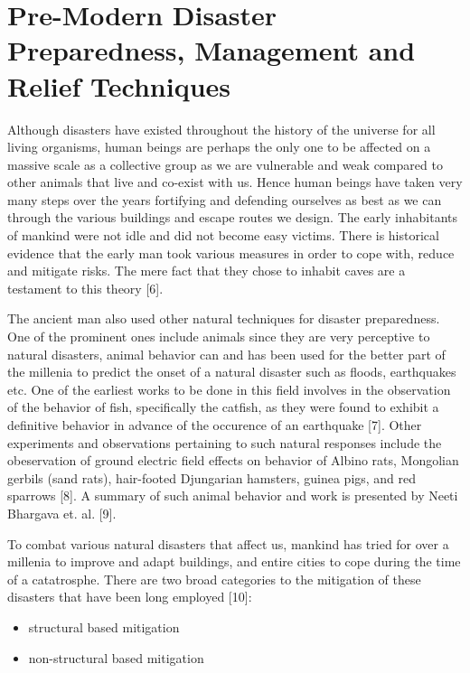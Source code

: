 \section{Pre-Modern Disaster Preparedness, Management and Relief Techniques}
\label{sec:pastwork:Pre-Modern Disaster Preparedness, Management and Relief Techniques}

Although disasters have existed throughout the history of the universe for all living organisms, human beings are perhaps the only one to be affected on a massive scale as a collective group as we are vulnerable and weak compared to other animals that live and co-exist with us. Hence human beings have taken very many steps over the years fortifying and defending ourselves as best as we can through the various buildings and escape routes we design. The early inhabitants of mankind were not idle and did not become easy victims. There is historical evidence that the early man took various measures in order to cope with, reduce and mitigate risks. The mere fact that they chose to inhabit caves are a testament to this theory [6].

The ancient man also used other natural techniques for disaster preparedness. One of the prominent ones include animals since they are very perceptive to natural disasters, animal behavior can and has been used for the better part of the millenia to predict the onset of a natural disaster such as floods, earthquakes etc. One of the earliest works to be done in this field involves in the observation of the behavior of fish, specifically the catfish, as they were found to exhibit a definitive behavior in advance of the occurence of an earthquake [7]. Other experiments and observations pertaining to such natural responses include the obeservation of ground electric field effects on behavior of Albino rats, Mongolian gerbils (sand rats), hair-footed Djungarian hamsters, guinea pigs, and red sparrows [8]. A summary of such animal behavior and work is presented by Neeti Bhargava et. al. [9].

To combat various natural disasters that affect us, mankind has tried for over a millenia to improve and adapt buildings, and entire cities to cope during the time of a catatrosphe. There are two broad categories to the mitigation of these disasters that have been long employed [10]:

\begin{itemize}
  \item structural based mitigation
  \item non-structural based mitigation
\end{itemize} 

